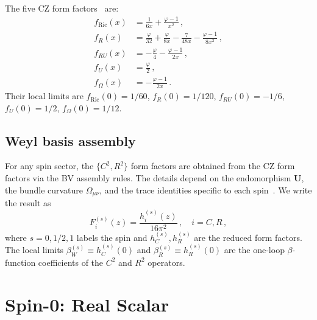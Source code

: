 \documentclass[aps,prd,twocolumn,superscriptaddress,nofootinbib,floatfix]{revtex4-2}
\begin{document}
The five CZ form factors~\cite{Codello:2012kq} are:
\begin{subequations}
\label{eq:CZ-ff}
\begin{align}
  f_{\text{Ric}}(x) &= \frac{1}{6x} + \frac{\varphi - 1}{x^2}\,,
  \label{eq:fRic}\\
  f_R(x) &= \frac{\varphi}{32} + \frac{\varphi}{8x}
    - \frac{7}{48x} - \frac{\varphi - 1}{8x^2}\,,
  \label{eq:fR}\\
  f_{RU}(x) &= -\frac{\varphi}{4} - \frac{\varphi - 1}{2x}\,,
  \label{eq:fRU}\\
  f_U(x) &= \frac{\varphi}{2}\,,
  \label{eq:fU}\\
  f_\Omega(x) &= -\frac{\varphi - 1}{2x}\,.
  \label{eq:fOmega}
\end{align}
\end{subequations}
Their local limits are $f_{\text{Ric}}(0) = 1/60$, $f_R(0) = 1/120$,
$f_{RU}(0) = -1/6$, $f_U(0) = 1/2$, $f_\Omega(0) = 1/12$.

\subsection{Weyl basis assembly}

For any spin sector, the $\{C^2, R^2\}$ form factors are obtained from the
CZ form factors via the BV assembly rules. The details depend on the
endomorphism $\mathbf{U}$, the bundle curvature $\Omega_{\mu\nu}$, and the
trace identities specific to each spin~\cite{Barvinsky:1987uw,Parker:2009uva}.
We write the result as
\begin{equation}
  F_i^{(s)}(z) = \frac{h_i^{(s)}(z)}{16\pi^2}\,,\quad i = C, R\,,
  \label{eq:Fi-hi}
\end{equation}
where $s = 0, 1/2, 1$ labels the spin and $h_C^{(s)}, h_R^{(s)}$ are the
reduced form factors. The local limits $\beta_W^{(s)} \equiv h_C^{(s)}(0)$ and
$\beta_R^{(s)} \equiv h_R^{(s)}(0)$ are the one-loop $\beta$-function
coefficients of the $C^2$ and $R^2$ operators.


\section{Spin-0: Real Scalar}
\label{sec:scalar}
\end{document}
